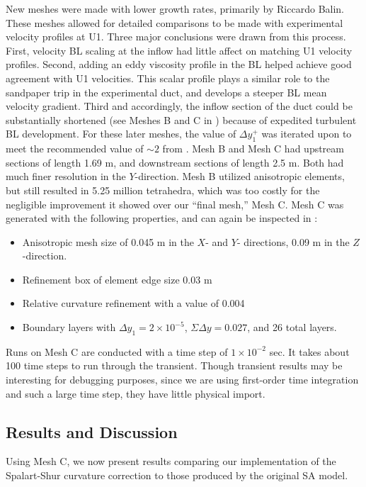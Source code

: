 \documentclass[11pt]{article}
\begin{document}
New meshes were made with lower growth rates, primarily by Riccardo Balin. These meshes allowed for detailed comparisons to be made with experimental velocity profiles at U1. Three major conclusions were drawn from this process. First, velocity BL scaling at the inflow had little affect on matching U1 velocity profiles. Second, adding an eddy viscosity profile in the BL helped achieve good agreement with U1 velocities. This scalar profile plays a similar role to the sandpaper trip in the experimental duct, and develops a steeper BL mean velocity gradient. Third and accordingly, the inflow section of the duct could be substantially shortened (see Meshes B and C in ) because of expedited turbulent BL development. For these later meshes, the value of $\Delta y^+_1$ was iterated upon to meet the recommended value of $\sim 2$ from \citet{spalart2001}. Mesh B and Mesh C had upstream sections of length 1.69 m, and downstream sections of length 2.5 m. Both had much finer resolution in the $Y$-direction. Mesh B utilized anisotropic elements, but still resulted in 5.25 million tetrahedra, which was too costly for the negligible improvement it showed over our ``final mesh,'' Mesh C. Mesh C was generated with the following properties, and can again be inspected in :
\begin{itemize}
\item Anisotropic mesh size of 0.045 m in the $X$- and $Y$- directions, 0.09 m in the $Z$-direction.
\item Refinement box of element edge size 0.03 m
\item Relative curvature refinement with a value of 0.004
\item Boundary layers with $\Delta y_1 = 2 \times 10^{-5}$, $\Sigma \Delta y = 0.027$, and 26 total layers.
\end{itemize}

Runs on Mesh C are conducted with a time step of $1 \times 10^{-2}$ sec. It takes about 100 time steps to run through the transient. Though transient results may be interesting for debugging purposes, since we are using first-order time integration and such a large time step, they have little physical import.

\subsection{Results and Discussion}

Using Mesh C, we now present results comparing our implementation of the Spalart-Shur curvature correction to those produced by the original SA model.
\end{document}
